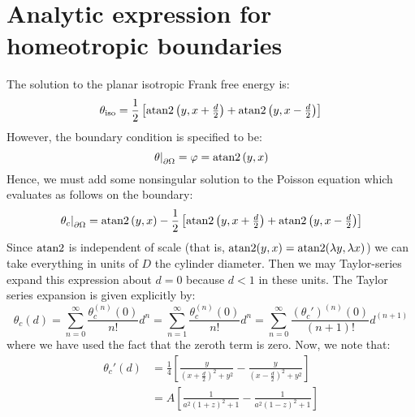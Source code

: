 \documentclass[reqno]{article}
\begin{document}
\section{Analytic expression for homeotropic boundaries}

The solution to the planar isotropic Frank free energy is:
\begin{equation}
    \theta_\text{iso}
    =
    \frac12 \left[
        \operatorname{atan2} \left(y, x + \tfrac{d}{2}\right)
        + \operatorname{atan2} \left(y, x - \tfrac{d}{2}\right)
    \right]
\end{equation}
However, the boundary condition is specified to be:
\begin{equation}
    \left.\theta \right|_{\partial \Omega}
    =
    \varphi
    =
    \operatorname{atan2} \left(y, x \right)
\end{equation}
Hence, we must add some nonsingular solution to the Poisson equation which evaluates as follows on the boundary:
\begin{equation}
    \left.\theta_c\right|_{\partial \Omega}
    =
    \operatorname{atan2} \left(y, x \right)
    -
    \frac12 \left[
        \operatorname{atan2} \left(y, x + \tfrac{d}{2}\right)
        + \operatorname{atan2} \left(y, x - \tfrac{d}{2}\right)
    \right]
\end{equation}
Since $\operatorname{atan2}$ is independent of scale (that is, $\operatorname{atan2}(y, x) = \operatorname{atan2}(\lambda y, \lambda x)$) we can take everything in units of $D$ the cylinder diameter.
Then we may Taylor-series expand this expression about $d = 0$ because $d < 1$ in these units.
The Taylor series expansion is given explicitly by:
\begin{equation}
    \theta_c(d)
    =
    \sum_{n = 0}^\infty
    \frac{\theta_c^{(n)}(0)}{n!} d^n
    =
    \sum_{n = 1}^\infty
    \frac{\theta_c^{(n)}(0)}{n!} d^n
    =
    \sum_{n = 0}^\infty
    \frac{\left(\theta_c'\right)^{(n)}(0)}{(n + 1)!} d^{(n + 1)}
\end{equation}
where we have used the fact that the zeroth term is zero.
Now, we note that:
\begin{equation}
\begin{split}
    \theta_c'(d)
    &=
    \frac14 \left[
        \frac{y}{\left( x + \frac{d}{2} \right)^2 + y^2}
        -
        \frac{y}{\left( x - \frac{d}{2} \right)^2 + y^2}
    \right] \\
    &=
    A \left[
        \frac{1}{a^2 \left( 1 + z \right)^2 + 1}
        -
        \frac{1}{a^2 \left( 1 - z \right)^2 + 1}
    \right]
\end{split}
\end{equation}
\end{document}
